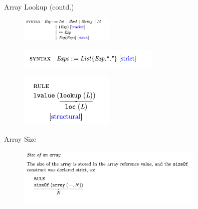 \documentclass{beamer}
\begin{document}
\begin{frame}{Array Lookup (contd.)}
    \begin{figure}
        \centering
    \includegraphics[width=0.4\textwidth]{array-syntax}
    \end{figure}

    \pause

    \begin{figure}
        \centering
    \includegraphics[width=0.6\textwidth]{exps-syntax}
    \end{figure}

    \pause
    \begin{figure}
        \centering
    \includegraphics[width=0.4\textwidth]{lvalue-lookup}
    \end{figure}

\end{frame}
\begin{frame}{Array Size}
    \begin{figure}[H]
        \centering
    \includegraphics[width=0.8\textwidth]{array-sizeof}
    \end{figure}

\end{frame}
\end{document}

